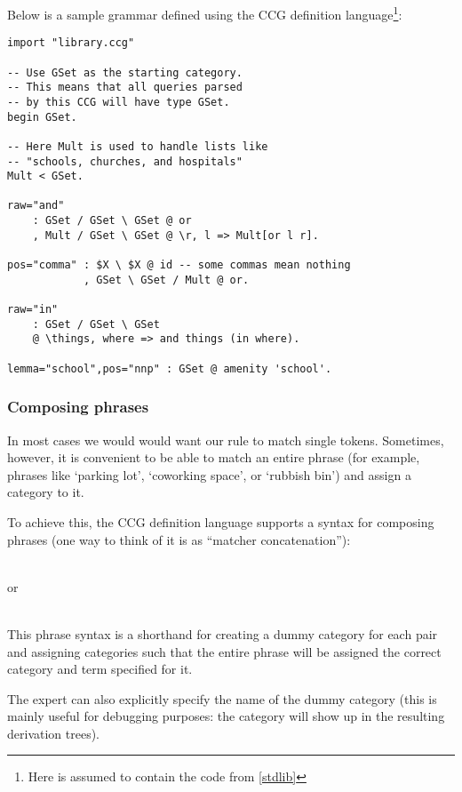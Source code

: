 \documentclass[main.tex]{subfiles}
\begin{document}
\begin{mexample}
Below is a sample grammar defined using the CCG definition language\footnote{
    Here  is assumed to contain the code from \cref{stdlib}
}:
\begin{lstwrap}\begin{lstlisting}
import "library.ccg"

-- Use GSet as the starting category.
-- This means that all queries parsed
-- by this CCG will have type GSet.
begin GSet.

-- Here Mult is used to handle lists like
-- "schools, churches, and hospitals"
Mult < GSet.

raw="and"
    : GSet / GSet \ GSet @ or
    , Mult / GSet \ GSet @ \r, l => Mult[or l r].

pos="comma" : $X \ $X @ id -- some commas mean nothing
            , GSet \ GSet / Mult @ or.

raw="in"
    : GSet / GSet \ GSet
    @ \things, where => and things (in where).

lemma="school",pos="nnp" : GSet @ amenity 'school'.
\end{lstlisting}\end{lstwrap}
\end{mexample}

\subsubsection{Composing phrases}
In most cases we would would want our rule to match single tokens. Sometimes,
however, it is convenient to be able to match an entire phrase (for example,
phrases like `parking lot', `coworking space', or `rubbish bin') and assign
a category to it.

To achieve this, the CCG definition language supports a syntax for composing phrases
(one way to think of it is as ``matcher concatenation''):
\begin{center}
     \code{<>}  \\
    or \\
       \\
\end{center}
This phrase syntax is a shorthand for creating a dummy category
for each pair and assigning categories such that the entire phrase will
be assigned the correct category and term specified for it.

The expert can also explicitly specify the name of the dummy category
(this is mainly useful for debugging purposes: the category will show up
in the resulting derivation trees).
\end{document}
